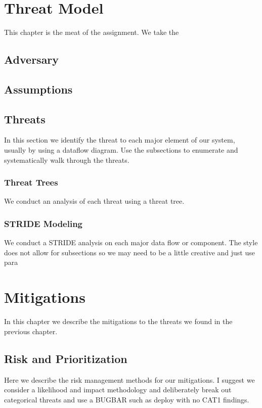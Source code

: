 \documentclass{tufte-book}
\begin{document}
\cleardoublepage
\chapter{Threat Model}
\label{ch:threatmodel}
This chapter is the meat of the assignment.  We take the


\section{Adversary}
\label{sec:adversary}

\section{Assumptions}
\label{sec:assumptions}

\section{Threats}
\label{sec:threats}
In this section we identify the threat to each major element of our system, usually by using a dataflow diagram.  Use the subsections to enumerate and systematically walk through the threats.
\subsection{Threat Trees}
We conduct an analysis of each threat using a threat tree.

\subsection{STRIDE Modeling}
We conduct a STRIDE analysis on each major data flow or component.  The style does not allow for subsections so we may need to be a little creative and just use para

\cleardoublepage
\chapter{Mitigations}
\label{ch:mitigations}
In this chapter we describe the mitigations to the threats we found in the previous chapter.

\section{Risk and Prioritization}
\label{sec:risk}
Here we describe the risk management methods for our mitigations. I suggest we consider a likelihood and impact methodology and deliberately break out categorical threats and use a BUGBAR such as deploy with no CAT1 findings.
\end{document}
